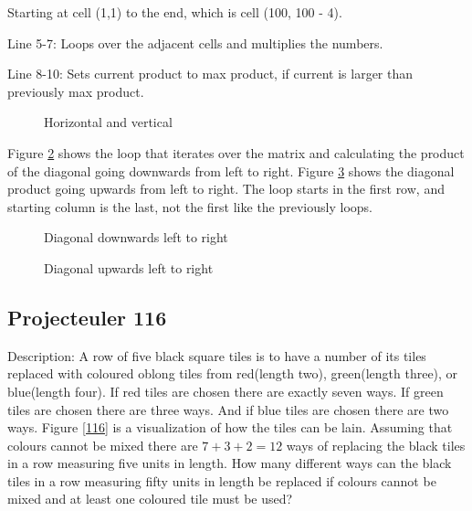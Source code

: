 \documentclass[a4paper, 11pt, titlepage]{article}
\begin{document}
\begin{list}{}{}
	\item Starting at cell (1,1) to the end, which is cell (100, 100 - 4).
	\item Line 5-7: Loops over the adjacent cells and multiplies the numbers.
	\item Line 8-10: Sets current product to max product, if current is larger than previously max product.
\end{list}
\begin{figure}[H]
	\begin{center}
		
		\caption{Horizontal and vertical}
		\label{111}
	\end{center}
\end{figure}
Figure \ref{112} shows the loop that iterates over the matrix and calculating the product of the diagonal going downwards from left to right. Figure \ref{113} shows the diagonal product going upwards from left to right. The loop starts in the first row, and starting column is the last, not the first like the previously loops.
\begin{figure}[H]
	\begin{center}
		
		\caption{Diagonal downwards left to right}
		\label{112}
	\end{center}
\end{figure}
\begin{figure}[H]
	\begin{center}
		
		\caption{Diagonal upwards left to right}
		\label{113}
	\end{center}
\end{figure}

\subsection{Projecteuler 116}
Description: A row of five black square tiles is to have a number of its tiles replaced with coloured oblong tiles from red(length two), green(length three), or blue(length four). If red tiles are chosen there are exactly seven ways. If green tiles are chosen there are three ways. And if blue tiles are chosen there are two ways. Figure \ref{116} is a visualization of how the tiles can be lain. Assuming that colours cannot be mixed there are $7+3+2=12$ ways of replacing the black tiles in a row measuring five units in length. How many different ways can the black tiles in a row measuring fifty units in length be replaced if colours cannot be mixed and at least one coloured tile must be used?
\end{document}
